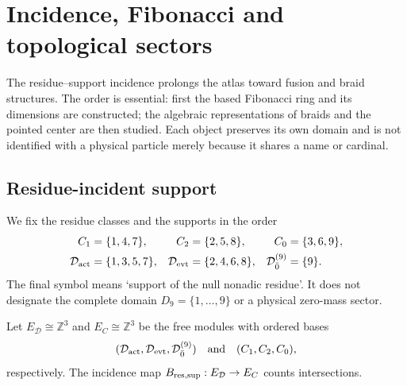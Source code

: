 \chapter[Incidence and Topological Sectors]{Incidence, Fibonacci and topological sectors}
\label{chap:incidencia-fibonacci-topologia}

The residue--support incidence prolongs the atlas toward fusion and braid
structures. The order is essential: first the based Fibonacci ring
and its dimensions are constructed; the algebraic representations
of braids and the pointed center are then studied. Each object preserves its own
domain and is not identified with a physical particle merely because it shares a name or
cardinal.

\section{Residue-incident support}
\label{sec:incidencia-residuo-soporte}

We fix the residue classes and the supports in the order
\[
 \begin{aligned}
 C_1&=\{1,4,7\},&
 C_2&=\{2,5,8\},&
 C_0&=\{3,6,9\},\\
 \mathcal D_{\rm act}&=\{1,3,5,7\},&
 \mathcal D_{\rm evt}&=\{2,4,6,8\},&
 \mathcal D_{\bar0}^{(9)}&=\{9\}.
 \end{aligned}
\]
The final symbol means ‘support of the null nonadic residue’. It does not designate
the complete domain \(D_9=\{1,\ldots,9\}\) or a physical zero-mass sector.

Let \(E_{\mathcal D}\cong\mathbb Z^3\) and
\(E_C\cong\mathbb Z^3\) be the free modules with ordered bases
\[
 (\mathcal D_{\rm act},\mathcal D_{\rm evt},
   \mathcal D_{\bar0}^{(9)})
 \quad\text{and}\quad
 (C_1,C_2,C_0),
\]
respectively. The incidence map
\(B_{\rm res,sup}:E_{\mathcal D}\to E_C\) counts intersections.

